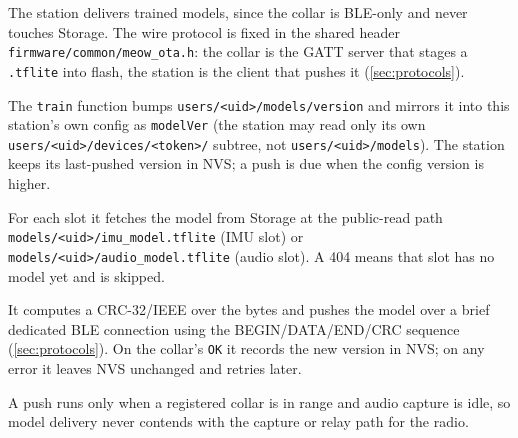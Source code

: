 The station delivers trained models, since the collar is BLE-only and never touches Storage. The wire
protocol is fixed in the shared header \texttt{firmware/common/meow\_ota.h}: the collar is the GATT
server that stages a \texttt{.tflite} into flash, the station is the client that pushes it
(\cref{sec:protocols}).

\begin{description}[leftmargin=1.6em,style=nextline]
  \item[Version gate.] The \texttt{train} function bumps \texttt{users/<uid>/models/version} and
        mirrors it into this station's own config as \texttt{modelVer} (the station may read only its
        own \texttt{users/<uid>/devices/<token>/} subtree, not \texttt{users/<uid>/models}). The
        station keeps its last-pushed version in NVS; a push is due when the config version is higher.
  \item[Download.] For each slot it fetches the model from Storage at the public-read path
        \texttt{models/<uid>/\allowbreak imu\_model.tflite} (IMU slot) or
        \texttt{models/<uid>/\allowbreak audio\_model.tflite} (audio slot). A 404 means that slot has no model
        yet and is skipped.
  \item[Push.] It computes a CRC-32/IEEE over the bytes and pushes the model over a brief dedicated
        BLE connection using the BEGIN/DATA/END/CRC sequence (\cref{sec:protocols}). On the collar's
        \texttt{OK} it records the new version in NVS; on any error it leaves NVS unchanged and retries
        later.
\end{description}

A push runs only when a registered collar is in range and audio capture is idle, so model delivery
never contends with the capture or relay path for the radio.
